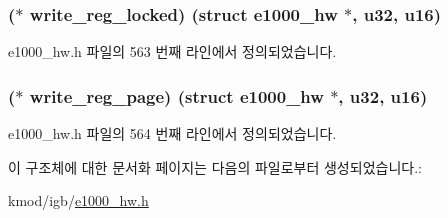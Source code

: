 \subsubsection[{\texorpdfstring{write\+\_\+reg\+\_\+locked}{write_reg_locked}}]{($\ast$ write\+\_\+reg\+\_\+locked) (struct {\bf e1000\+\_\+hw} $\ast$, {\bf u32}, {\bf u16})}\hypertarget{structe1000__phy__operations_a06ffb29c1c44bab3efdb6284f824ab6d}{}\label{structe1000__phy__operations_a06ffb29c1c44bab3efdb6284f824ab6d}


e1000\+\_\+hw.\+h 파일의 563 번째 라인에서 정의되었습니다.

\subsubsection[{\texorpdfstring{write\+\_\+reg\+\_\+page}{write_reg_page}}]{($\ast$ write\+\_\+reg\+\_\+page) (struct {\bf e1000\+\_\+hw} $\ast$, {\bf u32}, {\bf u16})}\hypertarget{structe1000__phy__operations_ae80ed9cf707fab7457236e9f99e20874}{}\label{structe1000__phy__operations_ae80ed9cf707fab7457236e9f99e20874}


e1000\+\_\+hw.\+h 파일의 564 번째 라인에서 정의되었습니다.



이 구조체에 대한 문서화 페이지는 다음의 파일로부터 생성되었습니다.\+:\begin{DoxyCompactItemize}
\item 
kmod/igb/\hyperlink{kmod_2igb_2e1000__hw_8h}{e1000\+\_\+hw.\+h}\end{DoxyCompactItemize}
